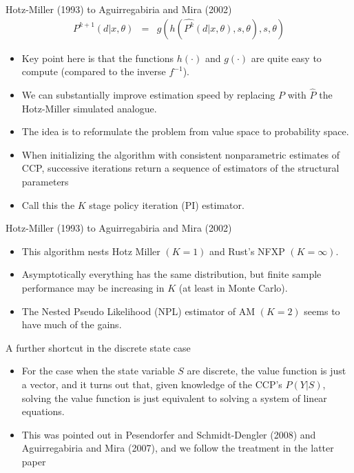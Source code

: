 \documentclass[xcolor=pdftex,dvipsnames,table,mathserif]{beamer}
\begin{document}
\begin{frame}{Hotz-Miller (1993) to Aguirregabiria and Mira (2002)}
\begin{eqnarray*}
P^{k+1}(d | x,\theta) &=& g(h(\hat{P^{k}}(d | x, \theta),s ,\theta),s,\theta)
\end{eqnarray*}
\vspace{-0.5cm}
\begin{itemize}
\item Key point here is that the functions $h(\cdot)$ and $g(\cdot)$ are quite easy to compute (compared to the inverse $f^{-1}$).
\item We can substantially improve estimation speed by replacing $P$ with $\hat{P}$ the Hotz-Miller simulated analogue.
\item The idea is to reformulate the problem from \alert{value space} to \alert{probability space}.
\item When initializing the algorithm with consistent nonparametric estimates of CCP, successive iterations return a sequence of estimators of the structural parameters
\item Call this the $K$ stage policy iteration (PI) estimator.
\end{itemize}
\end{frame}

\begin{frame}{Hotz-Miller (1993) to Aguirregabiria and Mira (2002)}
\begin{itemize}
\item This algorithm nests Hotz Miller $(K=1)$ and Rust's NFXP $(K=\infty)$.
\item Asymptotically everything has the same distribution, but finite sample performance may be increasing in $K$ (at least in Monte Carlo).
\item The Nested Pseudo Likelihood (NPL) estimator of AM $(K=2)$ seems to have much of the gains.
\end{itemize}
\end{frame}




\begin{frame}{A further shortcut in the discrete state case}
\begin{itemize}
\item For the case when the state variable $S$ are discrete, the value function is just a vector, and it turns out that, given knowledge of the CCP's $P(Y|S)$, solving the value function is just equivalent  to solving a system of linear equations.
\item  This was pointed out in Pesendorfer and Schmidt-Dengler (2008) and Aguirregabiria and Mira (2007), and we follow the treatment in the latter paper
\end{itemize}
\end{frame}
\end{document}
